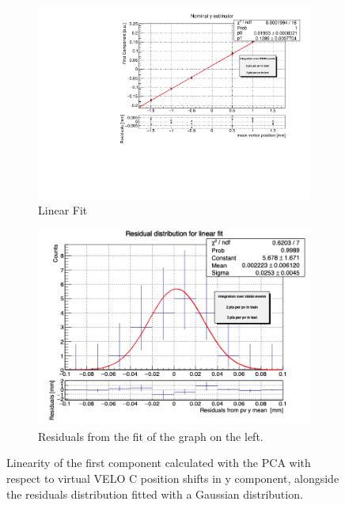 \begin{figure}
    \centering
    \begin{subfigure}{0.48\textwidth}
    \includegraphics[width=\linewidth]{figures/y_fit_veloC_MC.pdf}
    \caption{Linear Fit}\label{fig:y_veloC_fit_MC}
    \end{subfigure}
    \begin{subfigure}{0.48\textwidth}
    \includegraphics[width=\linewidth]{figures/y_res_veloC_MC.png}
    \caption{Residuals from the fit of the graph on the left. }\label{fig:y_veloC_res_MC}
    \end{subfigure}
    \caption{Linearity of the first component calculated with the PCA with respect to  virtual VELO C position shifts in y component, alongside the residuals distribution fitted with a Gaussian distribution.}
    \label{fig:y_veloC_MC}
\end{figure}

